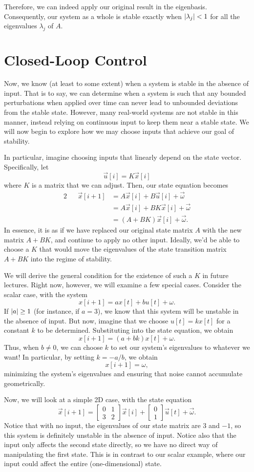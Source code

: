\documentclass[letterpaper]{article}
\theoremstyle{remark}
\newcommand{\mat}[1]{\ensuremath{\begin{bmatrix}#1\end{bmatrix}}}
\newcommand{\eqn}[1]{\begin{alignat*}{2}#1\end{alignat*}}
\begin{document}
Therefore, we can indeed apply our original result in the eigenbasis. Consequently, our system as a whole is stable exactly when $\abs{\lambda_j} < 1$ for all the eigenvalues $\lambda_j$ of $A$.

\section{Closed-Loop Control}
Now, we know (at least to some extent) when a system is stable in the absence of input. That is to say, we can determine when a system is such that any bounded perturbations when applied over time can never lead to unbounded deviations from the stable state. However, many real-world systems are not stable in this manner, instead relying on continuous input to keep them near a stable state. We will now begin to explore how we may choose inputs that achieve our goal of stability.

In particular, imagine choosing inputs that linearly depend on the state vector. Specifically, let
\[
    \vec{u}[i] = K\vec{x}[i]
\]
where $K$ is a matrix that we can adjust. Then, our state equation becomes
\eqn{
    && \vec{x}[i + 1] &= A\vec{x}[i] + B\vec{u}[i] + \vec{\omega} \\
    &&&= A\vec{x}[i] + BK\vec{x}[i] + \vec{\omega} \\
    &&&= (A + BK)\vec{x}[i] + \vec{\omega}.
}
In essence, it is as if we have replaced our original state matrix $A$ with the new matrix $A + BK$, and continue to apply no other input. Ideally, we'd be able to choose a $K$ that would move the eigenvalues of the state transition matrix $A + BK$ into the regime of stability.

We will derive the general condition for the existence of such a $K$ in future lectures. Right now, however, we will examine a few special cases. Consider the scalar case, with the system
\[
    x[i + 1] = ax[t] + bu[t] + \omega.
\]
If $\abs{a} \ge 1$ (for instance, if $a = 3$), we know that this system will be unstable in the absence of input. But now, imagine that we choose $u[t] = kx[t]$ for a constant $k$ to be determined. Substituting into the state equation, we obtain
\[
    x[i + 1] = (a + bk)x[t] + \omega.
\]
Thus, when $b \ne 0$, we can choose $k$ to set our system's eigenvalues to whatever we want! In particular, by setting $k = -a/b$, we obtain
\[
    x[i + 1] = \omega,
\]
minimizing the system's eigenvalues and ensuring that noise cannot accumulate geometrically.

Now, we will look at a simple 2D case, with the state equation
\[
    \vec{x}[i + 1] = \mat{ 0 & 1 \\ 3 & 2 } \vec{x}[i] + \mat{0 \\ 1}\vec{u}[t] + \vec{\omega}.
\]
Notice that with no input, the eigenvalues of our state matrix are $3$ and $-1$, so this system is definitely unstable in the absence of input. Notice also that the input only affects the second state directly, so we have no direct way of manipulating the first state. This is in contrast to our scalar example, where our input could affect the entire (one-dimensional) state.
\end{document}
